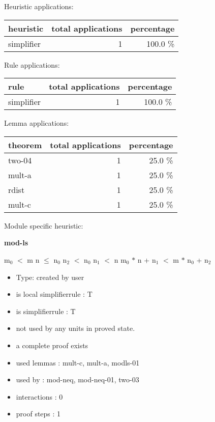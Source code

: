 \documentclass[a4paper]{article}
\begin{document}
\medskip


Heuristic applications:

\begin{supertabular}{l|r|r}
heuristic	& total applications & percentage \\ \hline
simplifier & 1 & 100.0 \% \\

\end{supertabular}

Rule applications:

\begin{supertabular}{l|r|r}
rule	        & total applications & percentage \\ \hline
simplifier & 1 & 100.0 \% \\

\end{supertabular}

Lemma applications:

\begin{supertabular}{l|r|r}
theorem	        & total applications & percentage \\ \hline
two-04 & 1 & 25.0 \% \\
mult-a & 1 & 25.0 \% \\
rdist & 1 & 25.0 \% \\
mult-c & 1 & 25.0 \% \\

\end{supertabular}

Module specific heuristic:

\pagebreak

{\LARGE\bf mod-ls}\label{lemma-mod-ls}

\medskip

 \Fol $\mbox{m}_{0}$ $<$ m \And n $\le$ $\mbox{n}_{0}$ \And $\mbox{n}_{2}$ $<$ $\mbox{n}_{0}$ \And $\mbox{n}_{1}$ $<$ n \Imp $\mbox{m}_{0}$ $*$ n + $\mbox{n}_{1}$ $<$ m $*$ $\mbox{n}_{0}$ + $\mbox{n}_{2}$

\begin{itemize}

\item Type: created by user

\item is local simplifierrule : T
\item is simplifierrule : T
\item not used by any units in proved state.
\item       a complete proof exists
\item       used lemmas  : mult-c, mult-a, modls-01
\item       used by      : mod-neq, mod-neq-01, two-03
\item       interactions : 0
\item       proof steps  : 1
\end{itemize}
\end{document}
